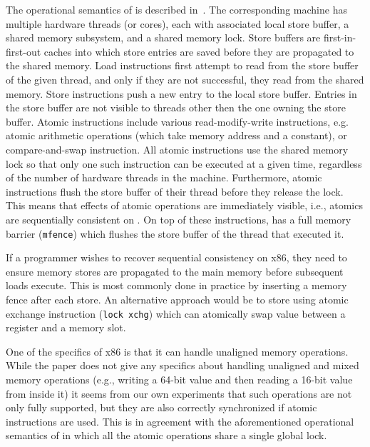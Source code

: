 The operational semantics of \xtso is described in~.
The corresponding machine has multiple hardware threads (or cores), each with
associated local store buffer, a shared memory subsystem, and a shared memory
lock.
Store buffers are first-in-first-out caches into which store entries are saved
before they are propagated to the shared memory.
Load instructions first attempt to read from the store buffer of the given
thread, and only if they are not successful, they read from the shared memory.
Store instructions push a new entry to the local store buffer.
Entries in the store buffer are not visible to threads other then the one
owning the store buffer.
Atomic instructions include various read-modify-write instructions, e.g. atomic
arithmetic operations (which take memory address and a constant),
or compare-and-swap instruction.
All atomic instructions use the shared memory lock so that only one such
instruction can be executed at a given time, regardless of the number of
hardware threads in the machine.
Furthermore, atomic instructions flush the store buffer of their thread before
they release the lock.
This means that effects of atomic operations are immediately visible, i.e.,
atomics are sequentially consistent on \xtso.
On top of these instructions, \xtso has a full memory barrier (\texttt{mfence})
which flushes the store buffer of the thread that executed it.

If a programmer wishes to recover sequential consistency on x86, they need to
ensure memory stores are propagated to the main memory before subsequent loads
execute.
This is most commonly done in practice by inserting a memory fence after each
store.
An alternative approach would be to store using atomic exchange instruction
(\texttt{lock xchg}) which can atomically swap value between a register and a
memory slot.

One of the specifics of x86 is that it can handle unaligned memory
operations.
While the \xtso paper does not give any specifics about handling unaligned and
mixed memory operations (e.g., writing a 64-bit value and then reading a 16-bit
value from inside it) it seems from our own experiments that such operations
are not only fully supported, but they are also correctly synchronized if
atomic instructions are used.
This is in agreement with the aforementioned operational semantics of \xtso in
which all the atomic operations share a single global lock.

